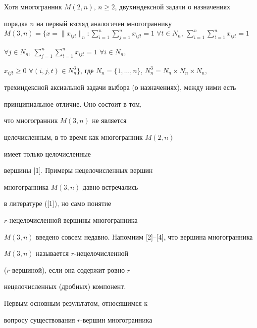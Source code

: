 

\maketitle


\label{begin}








Хотя многогранник $M(2,n)$, $n\geq 2$, двухиндексной задачи о назначениях


порядка $n$ на первый взгляд аналогичен многограннику $M(3,n)=\Big\{x=


\|x_{ijt}\|_n: \sum\limits_{i=1}^n\sum\limits_{j=1}^n x_{ijt}=1$ $\forall


t\in N_n$, $\sum\limits_{i=1}^n\sum\limits_{t=1}^n x_{ijt}=1$


$\forall j\in N_n$, $\sum\limits_{j=1}^n


\sum\limits_{t=1}^n x_{ijt}=1$ $\forall i\in N_n$,


$x_{ijt}\geq 0$ $\forall (i,j,t)\in


N^3_n\Big\}$, где $N_n=\{1,\dotsc,n\}$, $N^3_n=N_n\times N_n\times N_n$,


трехиндексной аксиальной задачи выбора (о назначениях), между ними есть


принципиальное отличие. Оно состоит в том, 


что многогранник $M(3,n)$ не является


целочисленным, в то  время как многогранник $M(2,n)$ 


имеет только целочисленные


вершины [1]. Примеры нецелочисленных вершин 


многогранника $M(3,n)$ давно встречались


в  литературе ([1]), но само понятие


$r$-нецелочисленной вершины многогранника


$M(3,n)$ введено совсем недавно. Напомним [2]--[4], что вершина многогранника


$M(3,n)$ называется $r$-нецелочисленной


($r$-вершиной), если она содержит ровно $r$


нецелочисленных (дробных) компонент. 


Первым основным результатом, относящимся к


вопросу существования $r$-вершин многогранника


